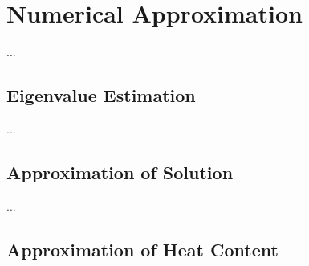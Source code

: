 \section{Numerical Approximation}


...


\subsection{Eigenvalue Estimation}


...


\subsection{Approximation of Solution}


...


\subsection{Approximation of Heat Content}


